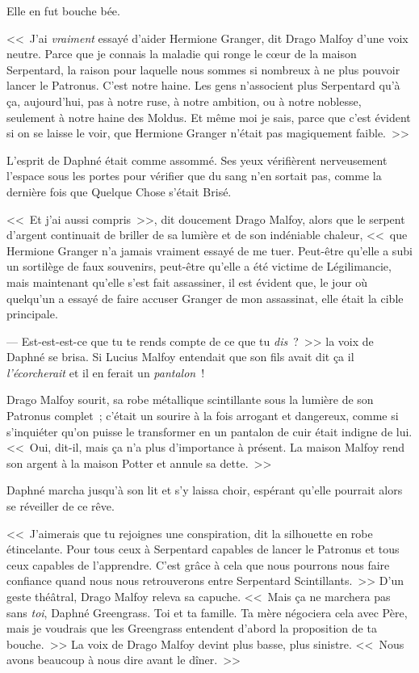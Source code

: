 Elle en fut bouche bée.

<<~J'ai \emph{vraiment} essayé d'aider Hermione Granger, dit Drago Malfoy d'une voix neutre. Parce que je connais la maladie qui ronge le cœur de la maison Serpentard, la raison pour laquelle nous sommes si nombreux à ne plus pouvoir lancer le Patronus. C'est notre haine. Les gens n'associent plus Serpentard qu'à ça, aujourd'hui, pas à notre ruse, à notre ambition, ou à notre noblesse, seulement à notre haine des Moldus. Et même moi je sais, parce que c'est évident si on se laisse le voir, que Hermione Granger n'était pas magiquement faible.~>>

L'esprit de Daphné était comme assommé. Ses yeux vérifièrent nerveusement l'espace sous les portes pour vérifier que du sang n'en sortait pas, comme la dernière fois que Quelque Chose s'était Brisé.

<<~Et j'ai aussi compris~>>, dit doucement Drago Malfoy, alors que le serpent d'argent continuait de briller de sa lumière et de son indéniable chaleur, <<~que Hermione Granger n'a jamais vraiment essayé de me tuer. Peut-être qu'elle a subi un sortilège de faux souvenirs, peut-être qu'elle a été victime de Légilimancie, mais maintenant qu'elle s'est fait assassiner, il est évident que, le jour où quelqu'un a essayé de faire accuser Granger de mon assassinat, elle était la cible principale.

--- Est-est-est-ce que tu te rends compte de ce que tu \emph{dis}~?~>> la voix de Daphné se brisa. Si Lucius Malfoy entendait que son fils avait dit ça il \emph{l'écorcherait} et il en ferait un \emph{pantalon}~!

Drago Malfoy sourit, sa robe métallique scintillante sous la lumière de son Patronus complet~; c'était un sourire à la fois arrogant et dangereux, comme si s'inquiéter qu'on puisse le transformer en un pantalon de cuir était indigne de lui. <<~Oui, dit-il, mais ça n'a plus d'importance à présent. La maison Malfoy rend son argent à la maison Potter et annule sa dette.~>>

Daphné marcha jusqu'à son lit et s'y laissa choir, espérant qu'elle pourrait alors se réveiller de ce rêve.

<<~J'aimerais que tu rejoignes une conspiration, dit la silhouette en robe étincelante. Pour tous ceux à Serpentard capables de lancer le Patronus et tous ceux capables de l'apprendre. C'est grâce à cela que nous pourrons nous faire confiance quand nous nous retrouverons entre Serpentard Scintillants.~>> D'un geste théâtral, Drago Malfoy releva sa capuche. <<~Mais ça ne marchera pas sans \emph{toi}, Daphné Greengrass. Toi et ta famille. Ta mère négociera cela avec Père, mais je voudrais que les Greengrass entendent d'abord la proposition de ta bouche.~>> La voix de Drago Malfoy devint plus basse, plus sinistre. <<~Nous avons beaucoup à nous dire avant le dîner.~>>

